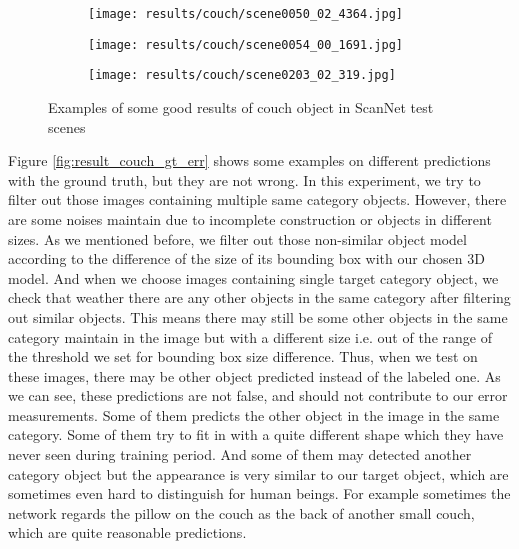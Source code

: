 \begin{figure}[h!]
  \begin{subfigure}[b]{0.32\linewidth}
    \texttt{[image: results/couch/scene0050\_02\_4364.jpg]}
  \end{subfigure}
  \begin{subfigure}[b]{0.32\linewidth}
    \texttt{[image: results/couch/scene0054\_00\_1691.jpg]}
  \end{subfigure}
  \begin{subfigure}[b]{0.32\linewidth}
    \texttt{[image: results/couch/scene0203\_02\_319.jpg]}
  \end{subfigure}
  \caption{Examples of some good results of couch object in ScanNet test scenes}
  \label{fig:result_couch}
\end{figure}

Figure \ref{fig:result_couch_gt_err} shows some examples on different predictions with the ground truth, but they are not wrong. In this experiment, we try to filter out those images containing multiple same category objects. However, there are some noises maintain due to incomplete construction or objects in different sizes. As we mentioned before, we filter out those non-similar object model according to the difference of the size of its bounding box with our chosen 3D model. And when we choose images containing single target category object, we check that weather there are any other objects in the same category after filtering out similar objects. This means there may still be some other objects in the same category maintain in the image but with a different size i.e. out of the range of the threshold we set for bounding box size difference. Thus, when we test on these images, there may be other object predicted instead of the labeled one. As we can see, these predictions are not false, and should not contribute to our error measurements. Some of them predicts the other object in the image in the same category. Some of them try to fit in with a quite different shape which they have never seen during training period. And some of them may detected another category object but the appearance is very similar to our target object, which are sometimes even hard to distinguish for human beings. For example sometimes the network regards the pillow on the couch as the back of another small couch, which are quite reasonable predictions.

